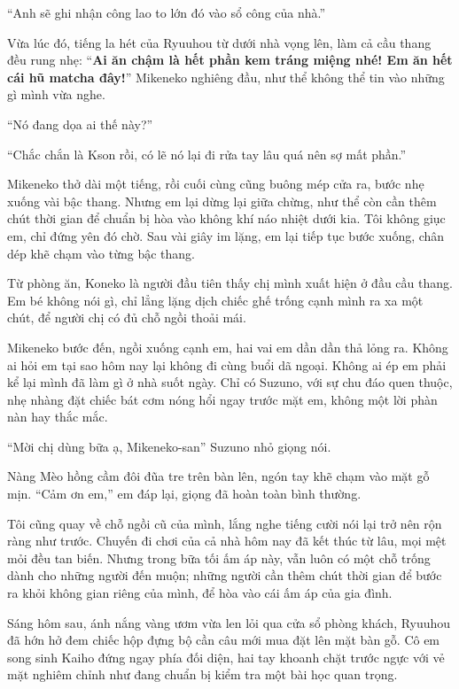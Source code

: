 ﻿\documentclass[../main.tex]{subfiles}
\begin{document}
``Anh sẽ ghi nhận công lao to lớn đó vào sổ công của nhà.''

Vừa lúc đó, tiếng la hét của Ryuuhou từ dưới nhà vọng lên, làm cả cầu thang đều rung nhẹ: ``\textbf{Ai ăn chậm là hết phần kem tráng miệng nhé! Em ăn hết cái hũ matcha đây!}'' Mikeneko nghiêng đầu, như thể không thể tin vào những gì mình vừa nghe.

``Nó đang dọa ai thế này?''

``Chắc chắn là Kson rồi, có lẽ nó lại đi rửa tay lâu quá nên sợ mất phần.''

Mikeneko thở dài một tiếng, rồi cuối cùng cũng buông mép cửa ra, bước nhẹ xuống vài bậc thang. Nhưng em lại dừng lại giữa chừng, như thể còn cần thêm chút thời gian để chuẩn bị hòa vào không khí náo nhiệt dưới kia. Tôi không giục em, chỉ đứng yên đó chờ. Sau vài giây im lặng, em lại tiếp tục bước xuống, chân dép khẽ chạm vào từng bậc thang.

Từ phòng ăn, Koneko là người đầu tiên thấy chị mình xuất hiện ở đầu cầu thang. Em bé không nói gì, chỉ lẳng lặng dịch chiếc ghế trống cạnh mình ra xa một chút, để người chị có đủ chỗ ngồi thoải mái.

Mikeneko bước đến, ngồi xuống cạnh em, hai vai em dần dần thả lỏng ra. Không ai hỏi em tại sao hôm nay lại không đi cùng buổi dã ngoại. Không ai ép em phải kể lại mình đã làm gì ở nhà suốt ngày. Chỉ có Suzuno, với sự chu đáo quen thuộc, nhẹ nhàng đặt chiếc bát cơm nóng hổi ngay trước mặt em, không một lời phàn nàn hay thắc mắc.

``Mời chị dùng bữa ạ, Mikeneko-san'' Suzuno nhỏ giọng nói.

Nàng Mèo hồng cầm đôi đũa tre trên bàn lên, ngón tay khẽ chạm vào mặt gỗ mịn. ``Cảm ơn em,'' em đáp lại, giọng đã hoàn toàn bình thường.

Tôi cũng quay về chỗ ngồi cũ của mình, lắng nghe tiếng cười nói lại trở nên rộn ràng như trước. Chuyến đi chơi của cả nhà hôm nay đã kết thúc từ lâu, mọi mệt mỏi đều tan biến. Nhưng trong bữa tối ấm áp này, vẫn luôn có một chỗ trống dành cho những người đến muộn; những người cần thêm chút thời gian để bước ra khỏi không gian riêng của mình, để hòa vào cái ấm áp của gia đình.


\omk

\pov{-}

Sáng hôm sau, ánh nắng vàng ươm vừa len lỏi qua cửa sổ phòng khách, Ryuuhou đã hớn hở đem chiếc hộp đựng bộ cần câu mới mua đặt lên mặt bàn gỗ. Cô em song sinh Kaiho đứng ngay phía đối diện, hai tay khoanh chặt trước ngực với vẻ mặt nghiêm chỉnh như đang chuẩn bị kiểm tra một bài học quan trọng.
\end{document}
